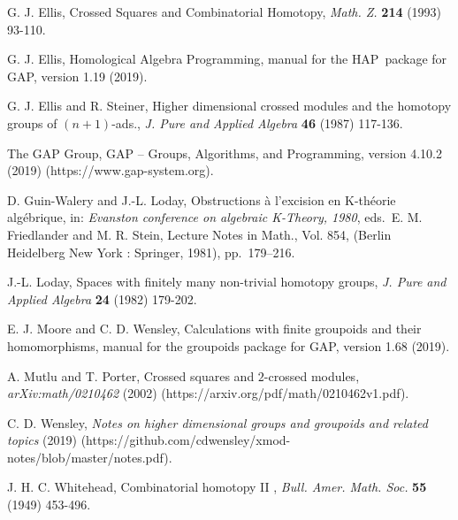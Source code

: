 \documentclass{ws-ijac}
\newcommand{\HAP}      {{\sf HAP}}
\begin{document}
\begin{thebibliography}{0}
	 {G. J. Ellis}, 
	{Crossed Squares and Combinatorial Homotopy}, 
	{\it Math. Z.} {\bf 214} (1993) 93-110.
	
	 {G. J. Ellis}, 
	{Homological Algebra Programming}, 
	manual for the \HAP\ package for \textsf{GAP}, version 1.19 (2019). 

	 {G. J. Ellis} and {R. Steiner}, 
	{Higher dimensional crossed modules and the homotopy groups 
	of $(n+1)$-ads.}, 
	{\it J. Pure and Applied Algebra} {\bf 46} (1987) 117-136.
	
	 {The GAP Group},
	{GAP -- Groups, Algorithms, and Programming}, version 4.10.2 (2019) 
	(https://www.gap-system.org).
	
	 {D. Guin-Walery} and {J.-L. Loday}, 
	{Obstructions \`a l'excision en K-th\'eorie alg\'ebrique}, 
	in: {\it Evanston conference on algebraic K-Theory, 1980},   
	eds.~E. M. Friedlander and M. R. Stein, 
	Lecture Notes in Math., Vol. 854, 
	(Berlin Heidelberg New York : Springer, 1981), pp.~179--216.  

	 {J.-L. Loday}, 
	{Spaces with finitely many non-trivial homotopy groups}, 
	{\it J. Pure and Applied Algebra} {\bf 24} (1982) 179-202.
	
	 {E. J. Moore} and {C. D. Wensley}, 
	{Calculations with finite groupoids and their homomorphisms},  
	manual for the \textsf{groupoids} package for \textsf{GAP}, 
	version 1.68 (2019). 

	 {A. Mutlu} and {T. Porter}, 
	{Crossed squares and $2$-crossed modules}, 
	{\it arXiv:math/0210462} (2002)
	(https://arxiv.org/pdf/math/0210462v1.pdf).
	
	 {C. D. Wensley},  
	\emph{Notes on higher dimensional groups and groupoids and related topics} 
	(2019) 
	(https://github.com/cdwensley/xmod-notes/blob/master/notes.pdf). 
	
	 {J. H. C. Whitehead}, 
	{Combinatorial homotopy II }, 
	{\it Bull. Amer. Math. Soc.} {\bf 55} (1949) 453-496.
	
\end{thebibliography}
\end{document}
